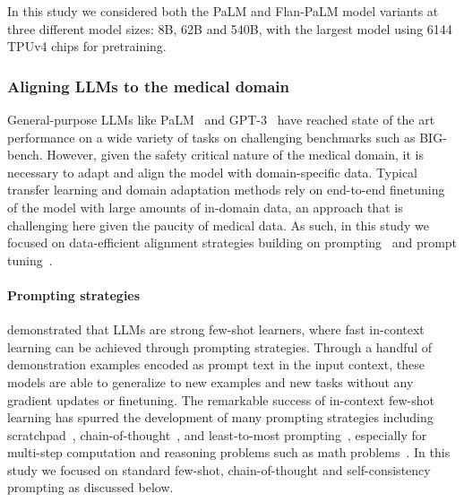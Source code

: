 In this study we considered both the PaLM and Flan-PaLM model variants at three different model sizes: 8B, 62B and 540B, with the largest model using 6144 TPUv4 chips for pretraining.

\subsubsection{Aligning LLMs to the medical domain}
\label{sec:aligning-llms-to-medical-domain}
General-purpose LLMs like PaLM~\cite{chowdhery2022palm} and GPT-3~\cite{brown2020language} have reached state of the art performance on a wide variety of tasks on challenging benchmarks such as BIG-bench. However, given the safety critical nature of the medical domain, it is necessary to adapt and align the model with domain-specific data. Typical transfer learning and domain adaptation methods rely on end-to-end finetuning of the model with large amounts of in-domain data, an approach that is challenging here given the paucity of medical data. As such, in this study we focused on data-efficient alignment strategies building on prompting~\cite{brown2020language} and prompt tuning~\cite{lester2021power}.

\paragraph{Prompting strategies} \citet{brown2020language} demonstrated that LLMs are strong few-shot learners, where fast in-context learning can be achieved through prompting strategies. Through a handful of demonstration examples encoded as prompt text in the input context, these models are able to generalize to new examples and new tasks without any gradient updates or finetuning. The remarkable success of in-context few-shot learning has spurred the development of many prompting strategies including scratchpad~\cite{nye2021show}, chain-of-thought~\cite{wei2022chain}, and least-to-most prompting~\cite{zhou2022least}, especially for multi-step computation and reasoning problems such as math problems~\cite{cobbe2021training}. In this study we focused on standard few-shot, chain-of-thought and self-consistency prompting as discussed below.

